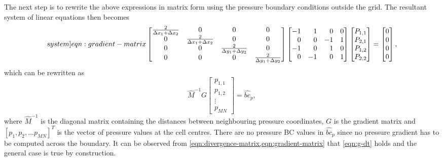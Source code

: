 \documentclass{article}
\numberwithin{equation}{section}
\begin{document}
The next step is to rewrite the above expressions in matrix form using the pressure boundary conditions outside the grid. The resultant system of linear equations then becomes
\begin{equation}\label[system]{eqn:gradient-matrix}
	\begin{bmatrix}{}
		\frac{2}{\Delta x_1 + \Delta x_2}	&0	&0	&0	\\
		0	&\frac{2}{\Delta x_1 + \Delta x_2}	&0	&0	\\
		0	&0	&\frac{2}{\Delta y_1 + \Delta y_2}	&0	\\
		0	&0	&0	&\frac{2}{\Delta y_1 + \Delta y_2}\\
	\end{bmatrix}
	\begin{bmatrix*}[r]
	-1 & 1 & 0 & 0 \\
	0 & 0 & -1 & 1 \\
	-1 & 0 & 1 & 0 \\
	0 & -1 & 0 & 1
	\end{bmatrix*}
	\begin{bmatrix}{}
  		P_{1,1} \\
	  	P_{2,1} \\
		P_{1,2} \\
		P_{2,2}
	\end{bmatrix}
	=
	\begin{bmatrix}{}
		0\\
		0\\
		0\\
		0
	\end{bmatrix},
\end{equation}
which can be rewritten as
\begin{equation}
	\hat{M}^{-1}{G} 
	\begin{bmatrix}{}
  		p_{1,1} \\
	  	p_{1,2} \\
	  	\vdots \\
	  	p_{MN}
	\end{bmatrix}
=\hat{bc}_p,
\end{equation}
where $\hat{M}^{-1}$ is the diagonal matrix containing the distances between neighbouring pressure coordinates, ${G}$ is the gradient matrix and $[p_1,p_2,...p_{MN}]^T$ is the vector of pressure values at the cell centres. There are no pressure BC values in $\hat{bc}_p$ since no pressure gradient has to be computed across the boundary. It can be observed from \cref{eqn:divergence-matrix,eqn:gradient-matrix} that \cref{eqn:g-dt} holds and the general case is true by construction.
\end{document}
